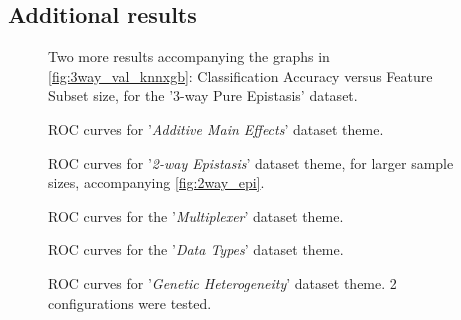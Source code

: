 \documentclass{article}
\begin{document}



\begin{appendices}
\section{Additional results}\label{sec:appendix-a}

\begin{figure}[ht]
\centering

\caption{Two more results accompanying the graphs in \autoref{fig:3way_val_knnxgb}: Classification Accuracy versus Feature Subset size, for the '3-way  Pure  Epistasis' dataset.}
\label{fig:3way_val_svmgnb}
\end{figure}

\begin{figure}[ht]
\centering

\caption{ROC curves for '\textit{Additive Main Effects}' dataset theme.}
\label{fig:additive_main_effects}
\end{figure}

\begin{figure}[ht]
\centering


\caption{ROC curves for '\textit{2-way Epistasis}' dataset theme, for larger sample sizes, accompanying \autoref{fig:2way_epi}.}
\label{fig:2way_epi_large_samplesizes}
\end{figure}

\begin{figure}[ht]
\centering

\caption{ROC curves for the '\textit{Multiplexer}' dataset theme.}
\label{fig:multiplexer_benchmarks}
\end{figure}

\begin{figure}[ht]
\centering

\caption{ROC curves for the '\textit{Data Types}' dataset theme.}
\label{fig:data_types}
\end{figure}

\begin{figure}[ht]
\centering

\caption{ROC curves for '\textit{Genetic Heterogeneity}' dataset theme. 2 configurations were tested.}
\label{fig:genetic_heterogeneity}
\end{figure}

\end{appendices}
\end{document}
